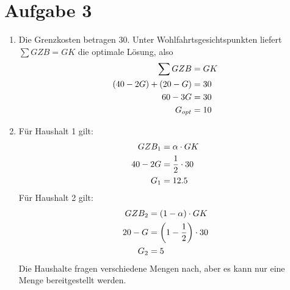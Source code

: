 \documentclass{article}
\begin{document}
	\section*{Aufgabe 3}
	\begin{enumerate}[label=(\alph*)]
		\item Die Grenzkosten betragen 30. Unter Wohlfahrtsgesichtspunkten liefert $\sum GZB = GK$ die optimale Lösung, also
		\begin{align}
			\sum GZB &= GK \notag \\
			(40-2G) + (20-G) &= 30 \notag \\
			60-3G &= 30 \notag \\
			G_{opt} &= 10 \notag
		\end{align}
		\item Für Haushalt 1 gilt:
		\begin{align}
			GZB_1 &= \alpha \cdot GK \notag \\
			40-2G &= \frac{1}{2} \cdot 30 \notag \\
			G_1 &= 12.5 \notag
		\end{align}
		Für Haushalt 2 gilt:
		\begin{align}
			GZB_2 &= (1-\alpha) \cdot GK \notag \\
			20-G &= \left(1-\frac{1}{2}\right) \cdot 30 \notag \\
			G_2 &= 5 \notag
		\end{align}
		Die Haushalte fragen verschiedene Mengen nach, aber es kann nur eine Menge bereitgestellt werden.
		\begin{center}
\end{center}
\end{enumerate}
\end{document}
